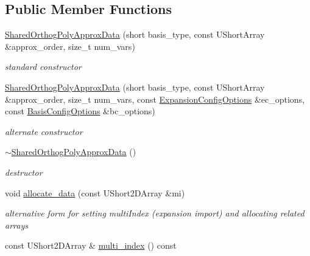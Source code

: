 \subsection*{Public Member Functions}
\begin{DoxyCompactItemize}
\item 
\hyperlink{classPecos_1_1SharedOrthogPolyApproxData_aae77fa8d7dacf98e787ce8029b430316}{Shared\+Orthog\+Poly\+Approx\+Data} (short basis\+\_\+type, const U\+Short\+Array \&approx\+\_\+order, size\+\_\+t num\+\_\+vars)\label{classPecos_1_1SharedOrthogPolyApproxData_aae77fa8d7dacf98e787ce8029b430316}

\begin{DoxyCompactList}\small\item\em standard constructor \end{DoxyCompactList}\item 
\hyperlink{classPecos_1_1SharedOrthogPolyApproxData_a9aa8344331531afb838e4b5a752a8949}{Shared\+Orthog\+Poly\+Approx\+Data} (short basis\+\_\+type, const U\+Short\+Array \&approx\+\_\+order, size\+\_\+t num\+\_\+vars, const \hyperlink{classPecos_1_1ExpansionConfigOptions}{Expansion\+Config\+Options} \&ec\+\_\+options, const \hyperlink{classPecos_1_1BasisConfigOptions}{Basis\+Config\+Options} \&bc\+\_\+options)\label{classPecos_1_1SharedOrthogPolyApproxData_a9aa8344331531afb838e4b5a752a8949}

\begin{DoxyCompactList}\small\item\em alternate constructor \end{DoxyCompactList}\item 
\hyperlink{classPecos_1_1SharedOrthogPolyApproxData_a9d6afaa7741b8c1004514aa65a832fd9}{$\sim$\+Shared\+Orthog\+Poly\+Approx\+Data} ()\label{classPecos_1_1SharedOrthogPolyApproxData_a9d6afaa7741b8c1004514aa65a832fd9}

\begin{DoxyCompactList}\small\item\em destructor \end{DoxyCompactList}\item 
void \hyperlink{classPecos_1_1SharedOrthogPolyApproxData_a4427c0ca8e114481f357064c17d6bb7a}{allocate\+\_\+data} (const U\+Short2\+D\+Array \&mi)\label{classPecos_1_1SharedOrthogPolyApproxData_a4427c0ca8e114481f357064c17d6bb7a}

\begin{DoxyCompactList}\small\item\em alternative form for setting multi\+Index (expansion import) and allocating related arrays \end{DoxyCompactList}\item 
const U\+Short2\+D\+Array \& \hyperlink{classPecos_1_1SharedOrthogPolyApproxData_ad93cb921a0df31fce4696f0051fe6a33}{multi\+\_\+index} () const \label{classPecos_1_1SharedOrthogPolyApproxData_ad93cb921a0df31fce4696f0051fe6a33}


\end{DoxyCompactItemize}
